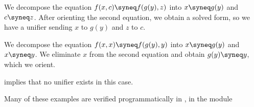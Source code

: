 \begin{example}
\begin{thmenum}
     We decompose the equation \( f(x, c) \syneq f(g(y), z) \) into \( x \syneq g(y) \) and \( c \syneq z \). After orienting the second equation, we obtain a solved form, so we have a unifier sending \( x \) to \( g(y) \) and \( z \) to \( c \).

     We decompose the equation \( f(x, x) \syneq f(g(y), y) \) into \( x \syneq g(y) \) and \( x \syneq y \). We eliminate \( x \) from the second equation and obtain \( g(y) \syneq y \), which we orient.

     implies that no unifier exists in this case.
  \end{thmenum}
\end{example}
\begin{comments}
  \item Many of these examples are verified programmatically in \cite{notebook:code}, in the module
\end{comments}
